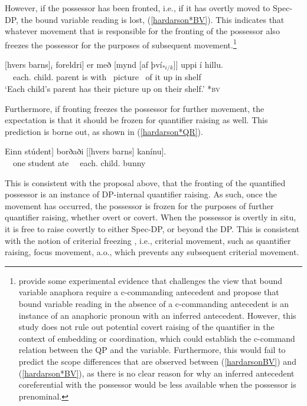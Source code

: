 \documentclass[output=paper]{langscibook}
\begin{document}
However, if the possessor has been fronted, i.e., if it has overtly moved to Spec-DP, the bound variable reading is lost, (\ref{hardarson*BV}). This indicates that whatever movement that is responsible for the fronting of the possessor also freezes the possessor for the purposes of subsequent movement.\footnote{\citet{carminati2002} provide some experimental evidence that challenges the view that bound variable anaphora require a c-commanding antecedent and propose that bound variable reading in the absence of a c-commanding antecedent is an instance of an anaphoric pronoun with an inferred antecedent. However, this study does not rule out potential covert raising of the quantifier in the context of embedding or coordination, which could establish the c-command relation between the QP and the variable. Furthermore, this would fail to predict the scope differences that are observed between (\ref{hardarsonBV}) and  (\ref{hardarson*BV}), as there is no clear reason for why an inferred antecedent coreferential with the possessor would be less available when the possessor is prenominal.}

\begin{exe}
	\ex	\gll	{[}[hvers barns]$_i$ foreldri] er með [mynd [af því$_{*i/k}$]] uppi í hillu.\label{hardarson*BV} \\
			~~each.{\hardGen} child.{\hardGen} parent  is with ~picture ~of it up in shelf\\
		\glt	`Each child's parent has their picture up on their shelf.' \hfill \textsc{*bv}
\end{exe}

\noindent Furthermore, if fronting freezes the possessor for further movement, the expectation is that it should be frozen for quantifier raising as well. This prediction is borne out, as shown in (\ref{hardarson*QR}).

\begin{exe}
	\ex	\gll	{[}Einn stúdent] borðaði [[hvers barns] kanínu].\label{hardarson*QR}\\
				~~one student ate ~~each.{\hardGen} child.{\hardGen} bunny\\
		\glt
			\begin{xlist}
			\end{xlist}
\end{exe}

This is consistent with the proposal above, that the fronting of the quantified possessor is an instance of DP-internal quantifier raising. As such, once the movement has occurred, the possessor is frozen for the purposes of further quantifier raising, whether overt or covert. When the possessor is overtly in situ, it is free to raise covertly to either Spec-DP, or beyond the DP. This is consistent with the notion of criterial freezing \citep{Rizzi:2006ti,wurmbrand2014gisli,wurmbrand2015}, i.e., criterial movement, such as quantifier raising, focus movement, a.o., which prevents any subsequent criterial movement.
\end{document}
